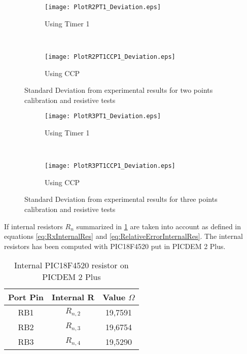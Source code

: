 \begin{figure}[!htb]
\centering
	\begin{subfigure}{0.45\textwidth}
	\texttt{[image: PlotR2PT1\_Deviation.eps]}
	\caption{Using Timer 1}
	\label{fig:PlotR2PT1Deviation}
	\end{subfigure}
	~
	\begin{subfigure}{0.45\textwidth}
	\texttt{[image: PlotR2PT1CCP1\_Deviation.eps]}
	\caption{Using CCP}
	\label{fig:PlotR2PT1CCP1Deviation}
	\end{subfigure}
\caption{Standard Deviation from experimental results for two points calibration and resistive tests}
\label{fig:DeviationResistive2P}
\end{figure}

\begin{figure}[!htb]
\centering
    \begin{subfigure}{0.45\textwidth}
	\texttt{[image: PlotR3PT1\_Deviation.eps]}
	\caption{Using Timer 1}
	\label{fig:PlotR3PT1Deviation}
	\end{subfigure}
	~
	\begin{subfigure}{0.45\textwidth}
	\texttt{[image: PlotR3PT1CCP1\_Deviation.eps]}
	\caption{Using CCP}
	\label{fig:PlotR3PT1CCP1Deviation}
	\end{subfigure}
\caption{Standard Deviation from experimental results for three points calibration and resistive tests}
\label{fig:DeviationResistive3P}
\end{figure}

If internal resistors $R_{n}$ summarized in \ref{tab:InternalResistors} are taken into account as defined in equations \eqref{eq:RxInternalRes} and \eqref{eq:RelativeErrorInternalRes}. The internal resistors has been computed with PIC18F4520 put in PICDEM 2 Plus.
\medskip

\begin{table}[!htb]
\centering
\begin{tabular}{|c|c|c|}
\hline 
Port Pin & Internal R & Value $\Omega$ \\ 
\hline 
RB1 & $R_{n,2}$ & 19,7591 \\ 
\hline 
RB2 & $R_{n,3}$ & 19,6754 \\ 
\hline 
RB3 & $R_{n,4}$ & 19,5290 \\ 
\hline 
\end{tabular} 
\caption{Internal PIC18F4520 resistor on PICDEM 2 Plus}
\label{tab:InternalResistors}
\end{table}

